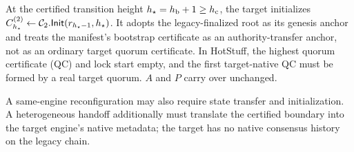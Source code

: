 \begin{definition}
\label{def:bootstrap}
At the certified transition height $h_{\star}=h_{\mathrm b}+1\ge h_{\mathrm c}$, the target initializes
$C^{(2)}_{h_{\star}}\gets\mathcal{C}_2.\mathsf{Init}(r_{h_{\star}-1},h_{\star})$. It adopts the legacy-finalized root as its
genesis anchor and treats the manifest's bootstrap certificate as an authority-transfer anchor, not as
an ordinary target quorum certificate. In HotStuff, the highest quorum certificate (QC) and lock start empty, and the first
target-native QC must be formed by a real target quorum. $A$ and $P$ carry over unchanged.
\end{definition}

A same-engine reconfiguration may also require state transfer and initialization. A heterogeneous
handoff additionally must translate the certified boundary into the target engine's native metadata;
the target has no native consensus history on the legacy chain.

\begin{table}[t]
\centering
\caption{Notation.}
\label{tab:notation}
\small
\renewcommand{\arraystretch}{1.12}
\end{table}


